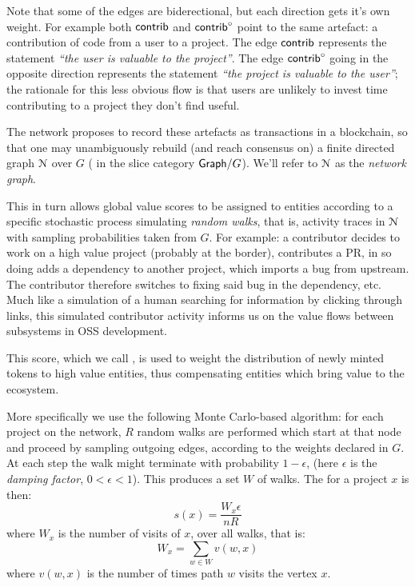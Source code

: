 Note that some of the edges are biderectional, but each direction gets
it's own weight. For example both $\mathsf{contrib}$ and $\mathsf{contrib}^\circ$ point to
the same artefact: a contribution of code from a user to a
project. The edge $\mathsf{contrib}$ represents the statement \emph{``the user
  is valuable to the project''}. The edge $\mathsf{contrib}^\circ$ going in the
opposite direction represents the statement \emph{``the project is
  valuable to the user''}; the rationale for this less obvious flow is
that users are unlikely to invest time contributing to a project they
don't find useful.


The \oscoin{} network proposes to record these artefacts as
transactions in a blockchain, so that one may unambiguously rebuild
(and reach consensus on) a finite directed graph $\mathcal{N}$ over $G$
(\ie{} in the slice category $\mathsf{Graph}/G$). We'll refer to $\mathcal{N}$
as the \emph{network graph}.

This in turn allows global value scores to be assigned to entities
according to a specific stochastic process simulating \emph{random
  walks}, that is, activity traces in $\mathcal{N}$ with sampling
probabilities taken from $G$. For example: a contributor decides to
work on a high value project (probably at the border), contributes a
PR, in so doing adds a dependency to another project, which imports a
bug from upstream. The contributor therefore switches to fixing said
bug in the dependency, etc. Much like a simulation of a human
searching for information by clicking through links, this simulated
contributor activity informs us on the value flows between subsystems
in OSS development.

This score, which we call \osrank{}, is used to weight the
distribution of newly minted tokens to high value entities, thus
compensating entities which bring value to the ecosystem.

More specifically we use the following Monte Carlo-based algorithm:
for each project on the network, $R$ random walks are performed which
start at that node and proceed by sampling outgoing edges, according
to the weights declared in $G$. At each step the walk might terminate
with probability $1 - \epsilon$, (here $\epsilon$ is the \emph{damping
  factor}, $0 < \epsilon < 1$). This produces a set $W$ of walks. The
\osrank{} for a project $x$ is then:
\[
  s(x) = \frac{W_x \epsilon}{n R}
\]
where $W_x$ is the number of visits of $x$, over all walks, that is:
\[
W_x = \sum_{w \in W} v(w,x)
\]
where $v(w,x)$ is the number of times path $w$ visits the vertex $x$.

